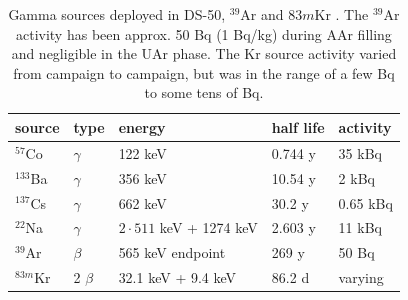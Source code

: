 \begin{table}[htbp]
\centering
\caption{Gamma sources deployed in DS-50, $^{39}$Ar and $83m$Kr \cite{Lippincott:2010jb}. The $^{39}$Ar activity has been approx. 50 Bq (1 Bq/kg) during AAr filling and negligible in the UAr phase. The Kr source activity varied from campaign to campaign, but was in the range of a few Bq to some tens of Bq.} %
\centering
\begin{tabular}{|l|l|l|l|l|}
\hline
\textbf{source} & \textbf{type} & \textbf{energy} & \textbf{half life} & \textbf{activity} \\ \hline
$^{57}$Co & $\gamma$ & 122 keV & 0.744 y  & 35 kBq \\ \hline
$^{133}$Ba & $\gamma$ & 356 keV & 10.54 y & 2 kBq \\ \hline
$^{137}$Cs & $\gamma$ & 662 keV & 30.2 y & 0.65 kBq \\ \hline
$^{22}$Na & $\gamma$ & $2\cdot 511$ keV + 1274 keV & 2.603 y & 11 kBq \\ \hline\hline
$^{39}$Ar & $\beta$ &  565 keV endpoint& 269 y  & 50 Bq\\ \hline
$^{83m}$Kr & 2 $\beta$ &  32.1 keV + 9.4 keV & 86.2 d & varying\\ \hline
\end{tabular}
\label{tbl:GammaSources}
\end{table}



